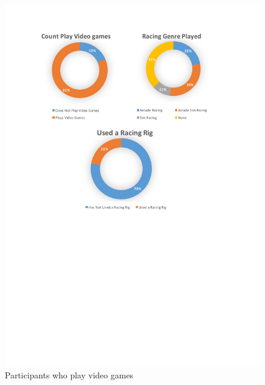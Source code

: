 \begin{figure}
	\centering
	\begin{minipage}{0.45\textwidth}
		\centering
		\includegraphics[width=\textwidth]{charts/playVideoGames.pdf}
		\caption[Participants who play video games]{Participants who play video games}
		\label{fig:chart-playVideoGames}
	\end{minipage}\hfill
	\begin{minipage}{0.45\textwidth}
		\centering

\end{minipage}
\end{figure}
